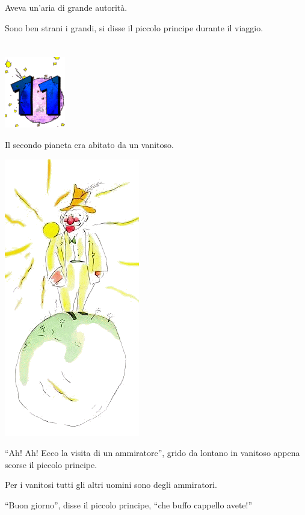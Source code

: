 \documentclass[11pt]{scrbook}
\begin{document}
Aveva un'aria di grande autorità.

Sono ben strani i grandi, si disse il piccolo principe durante il
viaggio.

\chapter{}
\begin{center}
\includegraphics{img/chapter11}
\end{center}

Il secondo pianeta era abitato da un vanitoso.

\begin{center}
\includegraphics{img/11a}
\end{center}

``Ah! Ah! Ecco la visita di un ammiratore'', grido da lontano in
vanitoso appena scorse il piccolo principe.

Per i vanitosi tutti gli altri uomini sono degli ammiratori.

``Buon giorno'', disse il piccolo principe, ``che buffo cappello
avete!''
\end{document}
